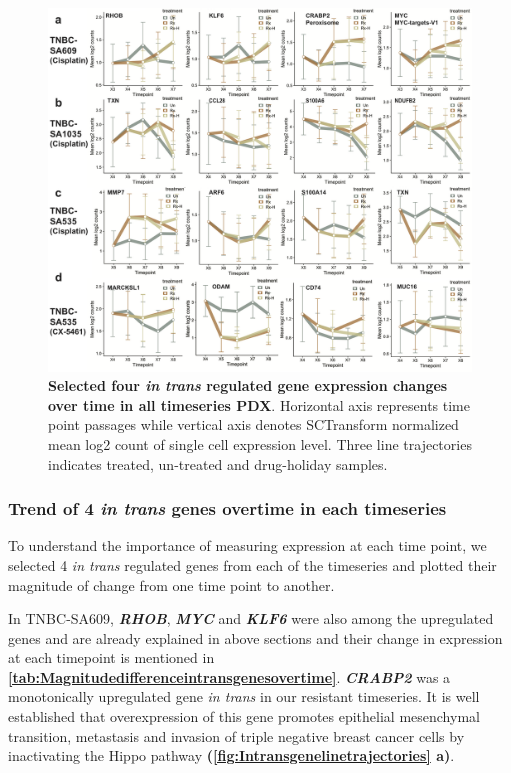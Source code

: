 \begin{figure}
\centering
 \includegraphics[width=\textwidth]{Figures/chap5/Intransgenelinetrajectories.png}
	
\caption[Four \textit{in trans} gene expression changed over time]
	{\small
	 \textbf{Selected four \textit{in trans} regulated gene expression changes over time in all timeseries PDX}.
	Horizontal axis represents time point passages while vertical axis denotes SCTransform normalized mean log2 count of single cell expression level. Three line trajectories indicates treated, un-treated and drug-holiday samples. }

	\label{fig:Intransgenelinetrajectories}
\end{figure} 


 \subsubsection{Trend of 4 \textit{in trans} genes overtime in each timeseries}

To understand the importance of measuring expression at each time point, we selected 4 \textit{in trans} regulated genes from each of the timeseries and plotted their magnitude of change from one time point to another.

In TNBC-SA609, \textit{\textbf{RHOB}}, \textit{\textbf{MYC}} and \textit{\textbf{KLF6}} were also among the upregulated genes and are already explained in above sections and their change in expression at each timepoint is mentioned in \textbf{\autoref{tab:Magnitudedifferenceintransgenesovertime}}.  \textit{\textbf{CRABP2}} was a monotonically upregulated gene \textit{in trans} in our resistant timeseries. It is well established that overexpression of this gene promotes epithelial mesenchymal transition, metastasis and invasion of triple negative breast cancer cells by inactivating the Hippo pathway \cite{feng2019crabp2} \textbf{(\autoref{fig:Intransgenelinetrajectories} a)}.

